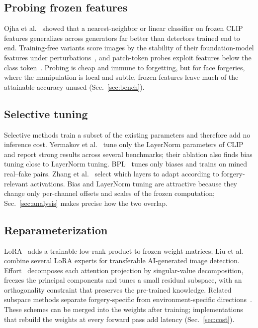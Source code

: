 \documentclass[fonts]{icst}
\begin{document}
\subsection{Probing frozen features}
Ojha et al.~\cite{ojha2023universal} showed that a nearest-neighbor or linear classifier on frozen CLIP features generalizes across generators far better than detectors trained end to end. Training-free variants score images by the stability of their foundation-model features under perturbations~\cite{tsai2024trainingfree}, and patch-token probes exploit features below the class token~\cite{abdullah2026tap}. Probing is cheap and immune to forgetting, but for face forgeries, where the manipulation is local and subtle, frozen features leave much of the attainable accuracy unused (Sec.~\ref{sec:bench}).

\subsection{Selective tuning}
Selective methods train a subset of the existing parameters and therefore add no inference cost. Yermakov et al.~\cite{yermakov2025clip,yermakov2025gend} tune only the LayerNorm parameters of CLIP and report strong results across several benchmarks; their ablation also finds bias tuning close to LayerNorm tuning. BPL~\cite{xu2026bpl} tunes only biases and trains on mined real--fake pairs. Zhang et al.~\cite{zhang2026layermask} select which layers to adapt according to forgery-relevant activations. Bias and LayerNorm tuning are attractive because they change only per-channel offsets and scales of the frozen computation; Sec.~\ref{sec:analysis} makes precise how the two overlap.

\subsection{Reparameterization}
LoRA~\cite{hu2022lora} adds a trainable low-rank product to frozen weight matrices; Liu et al.~\cite{liu2024mole} combine several LoRA experts for transferable AI-generated image detection. Effort~\cite{yan2025effort} decomposes each attention projection by singular-value decomposition, freezes the principal components and tunes a small residual subspace, with an orthogonality constraint that preserves the pre-trained knowledge. Related subspace methods separate forgery-specific from environment-specific directions~\cite{chen2026envsubspace,zhang2026layermask}. These schemes can be merged into the weights after training; implementations that rebuild the weights at every forward pass add latency (Sec.~\ref{sec:cost}).
\end{document}
